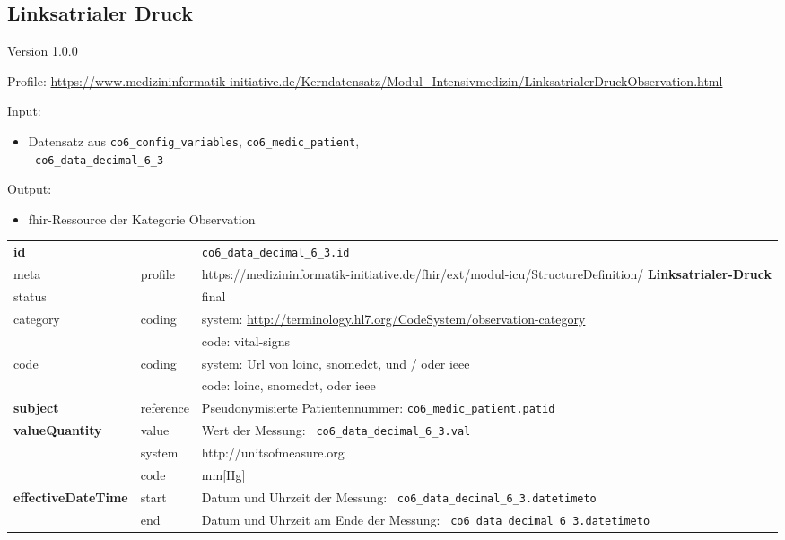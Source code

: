 \subsection{
Linksatrialer Druck} 
\noindent Version 1.0.0

\noindent Profile: \url{https://www.medizininformatik-initiative.de/Kerndatensatz/Modul_Intensivmedizin/LinksatrialerDruckObservation.html}

\noindent Input:
\begin{itemize}
	\item Datensatz aus \texttt{co6\_config\_variables}, \texttt{co6\_medic\_patient}, \\ \texttt{
co6\_data\_decimal\_6\_3}
\end{itemize}
Output:
\begin{itemize}
        \item \ac{fhir}-Ressource der Kategorie \glqq Observation\grqq{}
\end{itemize}
\begin{longtable}{|l|l|p{7.5cm}|}
        \hline
        \rowcolor{lightgray} \multicolumn{3}{|l|}{Data Mapping (inhaltlich)} \\ \hline
        \textbf{id} &  & \texttt{co6\_data\_decimal\_6\_3.id} \\ \hline
	meta & profile & https://medizininformatik-initiative.de/fhir/ext/modul-icu/StructureDefinition/\textbf{
Linksatrialer-Druck} \\ \hline 
	status &  & final   \\ \hline 
	category & coding & system: \url{http://terminology.hl7.org/CodeSystem/observation-category} \\
\cline{3-3}
	& & code: vital-signs \\ \hline
	code & coding & system: Url von \ac{loinc}, \ac{snomedct}, und / oder \ac{ieee} \\ 
	\cline{3-3} 
	 &  & code: \ac{loinc}, \ac{snomedct}, oder \ac{ieee} \\ \hline
	 \textbf{subject}  & reference & Pseudonymisierte Patientennummer: \texttt{co6\_medic\_patient.patid} \\ \hline
	 \textbf{valueQuantity}  & value & Wert der Messung: \texttt{
co6\_data\_decimal\_6\_3.val} \\
        \cline{2-3}
         & system & http://unitsofmeasure.org \\
         \cline{2-3}
         & code & mm[Hg] \\ \hline
     \textbf{effectiveDateTime}  & start & Datum und Uhrzeit der Messung: \texttt{
co6\_data\_decimal\_6\_3.datetimeto} \\
    \cline{2-3}
     & end & Datum und Uhrzeit am Ende der Messung: \texttt{
co6\_data\_decimal\_6\_3.datetimeto} \\ \hline
\end{longtable}


